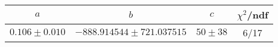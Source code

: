 \begin{tabular}{c|c|c|c}
$a$ & $b$ & $c$ & $\chi^2$/ndf \\
\hline
$0.106\pm0.010$ & $-888.914544\pm721.037515$ & $50\pm38$ & 6/17
\end{tabular}
